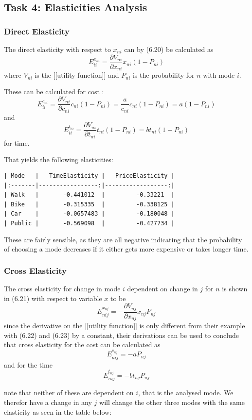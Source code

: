 \documentclass[a4paper,12pt]{article}
\begin{document}
\subsection{Task 4: Elasticities Analysis}
\subsubsection{Direct Elasticity}
The direct elasticity with respect to $x_{ni}$ can by (6.20) be calculated as
$$
E^{x_{ni}}_{ii} =
\dfrac { \partial V_{ni} } { \partial x_{ni} }
x_{ni} (1 - P_{ni})
$$
where $V_{ni}$ is the [[utility function]] and $P_{ni}$ is the probability for $n$ with mode $i$. 

These can be calculated for cost :
$$
E^{c_{ni}}_{ii} =
\dfrac { \partial V_{ni} } { \partial c_{ni} }
c_{ni} (1 - P_{ni}) 
= \frac{a}{c_{ni}}c_{ni}(1 - P_{ni}) = a(1 - P_{ni})
$$
and
$$
E^{t_{ni}}_{ii} =
\dfrac { \partial V_{ni} } { \partial t_{ni} }
t_{ni} (1 - P_{ni})
= b t_{ni}(1-P_{ni})
$$
for time.

That yields the following elasticities:
\begin{verbatim}
| Mode   |   TimeElasticity |   PriceElasticity |
|:-------|-----------------:|------------------:|
| Walk   |       -0.441012  |         -0.33221  |
| Bike   |       -0.315335  |         -0.338125 |
| Car    |       -0.0657483 |         -0.180048 |
| Public |       -0.569098  |         -0.427734 |
\end{verbatim}

These are fairly sensible, as they are all negative indicating that 
the probability of choosing a mode decreases if it either gets more expensive or takes longer time.

\subsubsection{Cross Elasticity}
The cross elasticity for change in mode $i$ dependent on change in $j$ for $n$  is shown in (6.21) with respect to variable $x$ to be
$$
E^{x_{nj}}_{nij} = -\dfrac{\partial V_{nj}}{\partial x_{nj}}
x_{nj} P_{nj}
$$
since the derivative on the [[utility function]] is only different from their example with (6.22) and (6.23) by a constant, their derivations can be used to conclude that cross elasticity for the cost can be calculated as
$$
E^{c_{nj}}_{nij} =-aP_{nj}
$$
and for the time
$$
E^{t_{nj}}_{nij} =-b t_{nj} P_{nj}
$$

note that neither of these are dependent on $i$, that is the analysed mode. We therefor have a change in any $j$ will change the other three modes with the same elasticity as seen in the table below:
\end{document}

